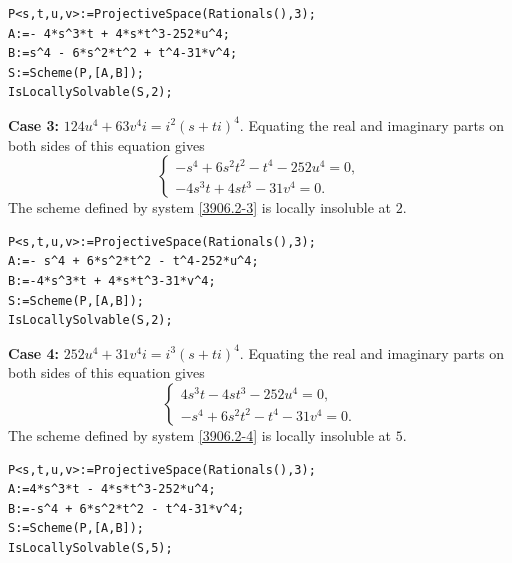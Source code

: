 \documentclass[a4paper,12pt,english,reqno]{amsart}
\begin{document}
%
\begin{lstlisting}
P<s,t,u,v>:=ProjectiveSpace(Rationals(),3);
A:=- 4*s^3*t + 4*s*t^3-252*u^4;
B:=s^4 - 6*s^2*t^2 + t^4-31*v^4;
S:=Scheme(P,[A,B]);
IsLocallySolvable(S,2);
\end{lstlisting}


{\bf Case 3:} $124u^4+63v^4i=i^2(s+ti)^4$. Equating the real and imaginary parts on both sides of this equation gives
\begin{equation}\label{3906.2-3}
\begin{cases}
-s^4 + 6s^2t^2 - t^4 -252u^4=0,\\
-4s^3t + 4st^3 - 31v^4=0.
\end{cases}
\end{equation}
The scheme defined by system \eqref{3906.2-3} is locally insoluble at $2$.
%
\begin{lstlisting}
P<s,t,u,v>:=ProjectiveSpace(Rationals(),3);
A:=- s^4 + 6*s^2*t^2 - t^4-252*u^4;
B:=-4*s^3*t + 4*s*t^3-31*v^4;
S:=Scheme(P,[A,B]);
IsLocallySolvable(S,2);
\end{lstlisting}


{\bf Case 4:} $252u^4+31v^4i=i^3(s+ti)^4$. Equating the real and imaginary parts on both sides of this equation gives
\begin{equation}\label{3906.2-4}
\begin{cases}
4s^3t - 4st^3 - 252u^4=0,\\
-s^4 + 6s^2t^2 - t^4 - 31v^4=0.
\end{cases}
\end{equation}
The scheme defined by system \eqref{3906.2-4} is locally insoluble at $5$.

\begin{lstlisting}
P<s,t,u,v>:=ProjectiveSpace(Rationals(),3);
A:=4*s^3*t - 4*s*t^3-252*u^4;
B:=-s^4 + 6*s^2*t^2 - t^4-31*v^4;
S:=Scheme(P,[A,B]);
IsLocallySolvable(S,5);
\end{lstlisting}
\end{document}
